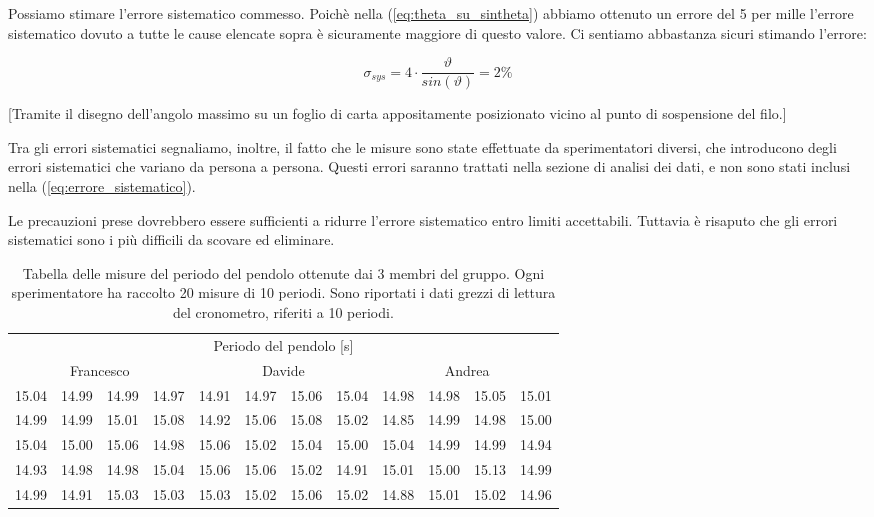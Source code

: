 Possiamo stimare l'errore sistematico commesso. Poichè nella (\ref{eq:theta_su_sintheta})
abbiamo ottenuto un errore del 5 per mille l'errore sistematico dovuto a tutte le
cause elencate sopra è sicuramente maggiore di questo valore. Ci sentiamo abbastanza
sicuri stimando l'errore:

\begin{equation}
    \sigma_{sys} = 4 \cdot \frac{\vartheta}{sin(\vartheta)} = 2 \%
    \label{eq:errore_sistematico}
\end{equation}

[Tramite il disegno dell'angolo massimo su un foglio di carta appositamente
posizionato vicino al punto di sospensione del filo.]

Tra gli errori sistematici segnaliamo, inoltre, il fatto che le misure sono state
effettuate da sperimentatori diversi, che introducono degli errori sistematici
che variano da persona a persona. Questi errori saranno trattati nella sezione
di analisi dei dati, e non sono stati inclusi nella (\ref{eq:errore_sistematico}).

Le precauzioni prese dovrebbero essere sufficienti a ridurre l'errore sistematico
entro limiti accettabili. Tuttavia è risaputo che gli errori sistematici
sono i più difficili da scovare ed eliminare.
	
\begin{table}[bt]
	\begin{tabular} {c c c c | c c c c | c c c c}
		\toprule
		\multicolumn{12}{c}{Periodo del pendolo [s]} \\
		\multicolumn{4}{c}{Francesco} & \multicolumn{4}{c}{Davide} & \multicolumn{4}{c}{Andrea} \\
		\midrule
		15.04 & 14.99 & 14.99 & 14.97 & 14.91 & 14.97 & 15.06 & 15.04 & 14.98 & 14.98 & 15.05 & 15.01 \\
		14.99 & 14.99 & 15.01 & 15.08 & 14.92 & 15.06 & 15.08 & 15.02 & 14.85 & 14.99 & 14.98 & 15.00 \\
		15.04 & 15.00 & 15.06 & 14.98 & 15.06 & 15.02 & 15.04 & 15.00 & 15.04 & 14.99 & 14.99 & 14.94 \\
		14.93 & 14.98 & 14.98 & 15.04 & 15.06 & 15.06 & 15.02 & 14.91 & 15.01 & 15.00 & 15.13 & 14.99 \\
		14.99 & 14.91 & 15.03 & 15.03 & 15.03 & 15.02 & 15.06 & 15.02 & 14.88 & 15.01 & 15.02 & 14.96 \\
		\bottomrule
	\end{tabular}

	\caption{Tabella delle misure del periodo del pendolo ottenute dai 3 membri del gruppo.
        Ogni sperimentatore ha raccolto 20 misure di 10 periodi. Sono riportati
        i dati grezzi di lettura del cronometro, riferiti a 10 periodi. }
    \label{tab:pendolo}
\end{table}

